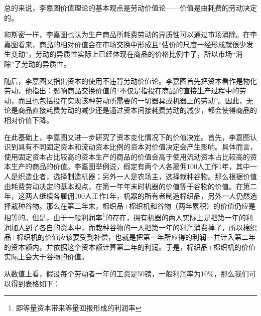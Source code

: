 总的来说，李嘉图价值理论的基本观点是劳动价值论——价值是由耗费的劳动决定的\cite[142]{CaiJiMingCongGuDianZhengZhiJingJiXueDaoZhongGuoTeSeSheHuiZhuYiZhengZhiJingJiXueJiYuZhongGuoShiJiaoDeZhengZhiJingJiXueYanBianShangCe2023}。

和斯密一样，李嘉图也认为生产商品所耗费劳动的异质性可以通过市场消除。在李嘉图看来，商品的相对价值会在市场交换中形成且“估价的尺度一经形成就很少发生变动”，劳动的异质性实际上已经体现在商品的价格比例中了，所以市场“消除”了劳动的异质性\cite[13-14]{DaWei*LiJiaTuZhengZhiJingJiXueJiFuShuiYuanLi2021}。

随后，李嘉图又指出资本的使用不违背劳动价值论。李嘉图首先把资本看作是物化劳动，他指出：影响商品交换价值的“不仅是指投在商品的直接生产过程中的劳动，而且也包括投在实现该种劳动所需要的一切器具或机器上的劳动”\cite[17]{DaWei*LiJiaTuZhengZhiJingJiXueJiFuShuiYuanLi2021}。因此，无论是商品直接耗费劳动的减少还是通过资本间接耗费劳动的减少，都会使得商品的相对价值下降\cite[18]{DaWei*LiJiaTuZhengZhiJingJiXueJiFuShuiYuanLi2021}。

在此基础上，李嘉图又进一步研究了资本变化情况下的价值决定。首先，李嘉图认识到具有不同固定资本和流动资本比例的资本对价值决定会产生影响。具体而言，使用固定资本占比较高的资本生产的商品的价值会高于使用流动资本占比较高的资本生产的商品的价值。李嘉图举例说，假定有两个人各雇佣100人工作1年，其中一人是织造业者，选择制造机器；另外一人是农场主，选择栽种谷物。那么根据价值由耗费劳动决定的基本观点，在第一年年末时机器的价值等于谷物的价值。在第二年，这两人继续各雇佣100人工作1年，机器的所有者制造棉织品，另外一人仍然选择栽种谷物。那么在第二年末，棉织品+棉织机和谷物（两年累积）的价值仍应是相等的。但是，由于一般利润率\footnote{即等量资本带来等量回报形成的利润率}的存在，拥有机器的两人实际上是把第一年的利润加入到了各自的资本中，而栽种谷物的一人把第一年的利润消费掉了，所以棉织品+棉织机的价值应该要受到补偿，也就是把第一年所应得的利润一并计入第二年的资本额内，并依据这个资本额计算第二年的利润。于是，棉织品+棉织机的价值实际上会大于谷物的价值\cite[24-25]{DaWei*LiJiaTuZhengZhiJingJiXueJiFuShuiYuanLi2021}\cite[119]{YanZhiJieXiFangJingJiXueShuoShiJiaoChengDiErBan2013}。

从数值上看，假设每个劳动者一年的工资是50镑，一般利润率为10\%，那么我们可以得到表格如下\cite[19]{LiRenJunJieZhiLiLun2004}：


